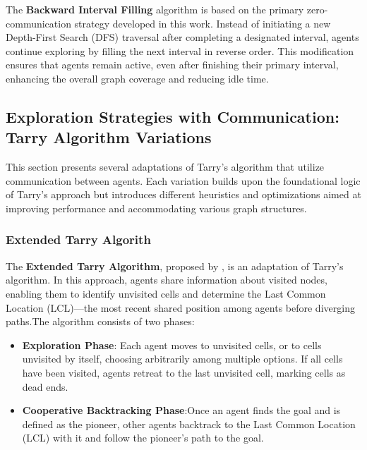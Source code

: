 The \textbf{Backward Interval Filling} algorithm is based on the primary zero-communication strategy developed in this work. Instead of initiating a new Depth-First Search (DFS) traversal after completing a designated interval, agents continue exploring by filling the next interval in reverse order. This modification ensures that agents remain active, even after finishing their primary interval, enhancing the overall graph coverage and reducing idle time.

\subsection{Exploration Strategies with Communication: Tarry Algorithm Variations}

\label{section_method_tarry_variations}

This section presents several adaptations of Tarry's algorithm that utilize communication between agents. Each variation builds upon the foundational logic of Tarry's approach but introduces different heuristics and optimizations aimed at improving performance and accommodating various graph structures.

\subsubsection{Extended Tarry Algorith}
\label{section_method_extended_tarry}

The \textbf{Extended Tarry Algorithm}, proposed by , is an adaptation of Tarry's algorithm. In this approach, agents share information about visited nodes, enabling them to identify unvisited cells and determine the Last Common Location (LCL)—the most recent shared position among agents before diverging paths.The algorithm consists of two phases:

\begin{itemize}
    \item \textbf{Exploration Phase}: Each agent moves to unvisited cells, or to cells unvisited by itself, choosing arbitrarily among multiple options. If all cells have been visited, agents retreat to the last unvisited cell, marking cells as dead ends.
    \item \textbf{Cooperative Backtracking Phase}:Once an agent finds the goal and is defined as the pioneer, other agents backtrack to the Last Common Location (LCL) with it and follow the pioneer's path to the goal.
\end{itemize}

